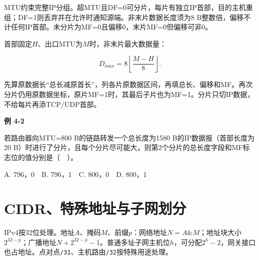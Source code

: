 MTU约束完整IP分组。超MTU且DF=0可分片，每片有独立IP首部，目的主机重组；DF=1则丢弃并在允许时通知源端。非末片数据长度须为8 B整数倍，偏移不计任何IP首部。未分片为MF=0且偏移0，末片MF=0但偏移可非0。

首部固定\(H\)、出口MTU为\(M\)时，非末片最大数据量：

\[D_{max}=8\left\lfloor\frac{M-H}{8}\right\rfloor.\]

先算原数据长``总长减原首长''，列各片原数据区间，再填总长、偏移和MF。再次分片仍用原数据坐标，原片MF=1时，其最后子片也为MF=1。分片只切IP数据，不给每片再添TCP/UDP首部。

\par\medskip{}\noindent\hypertarget{CN04-E02}{}\label{CN04-E02}\textbf{例 4-2}\par\nobreak\smallskip

若路由器向MTU=800 B的链路转发一个总长度为1580 B的IP数据报（首部长度为20 B）时进行了分片，且每个分片尽可能大，则第2个分片的总长度字段和MF标志位的值分别是（　）。

A. 796，0　B. 796，1　C. 800，0　D. 800，1

\section{CIDR、特殊地址与子网划分}\label{CN04-addresses}

IPv4按32位处理。地址\(A\)、掩码\(M\)、前缀\(p\)：网络地址\(N=A\mathbin{\&}M\)；地址块大小\(2^{32-p}\)；广播地址\(N+2^{32-p}-1\)。普通多址子网主机位\(h\)，可分配\(2^h-2\)，网关接口也占地址。点对点\texttt{/\allowbreak{}31}、主机路由\texttt{/\allowbreak{}32}按特殊用途处理。


